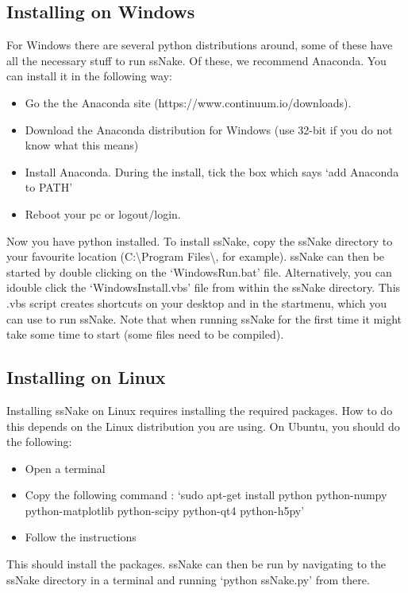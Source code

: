 \documentclass[11pt,a4paper]{article}
\begin{document}
\subsection{Installing on Windows}
For Windows there are several python distributions around, some of these have all the necessary stuff to run ssNake. Of these, we recommend Anaconda. You can install it in the following way:
\begin{itemize}
\item Go the the Anaconda site (https://www.continuum.io/downloads).
\item Download the Anaconda distribution for Windows (use 32-bit if you do not know what this means)
\item Install Anaconda. During the install, tick the box which says `add Anaconda to PATH'
\item Reboot your pc or logout/login.
\end{itemize}
Now you have python installed. To install ssNake, copy the ssNake directory to your favourite location (C:\textbackslash{}Program Files\textbackslash{}, for example). 
ssNake can then be started by double clicking on the `WindowsRun.bat' file. Alternatively, you can idouble click the `WindowsInstall.vbs' file from within the ssNake
directory. This .vbs script creates shortcuts on your desktop and in the startmenu, which you can use to run ssNake. Note that when running
ssNake for the first time it might take some time to start (some files need to be compiled).

\subsection{Installing on Linux}
Installing ssNake on Linux requires installing the required packages. How to do this depends on the Linux distribution you are using. On Ubuntu, you should do the following:
\begin{itemize}
\item Open a terminal
\item Copy the following command : `sudo apt-get install python python-numpy python-matplotlib python-scipy python-qt4 python-h5py'
\item Follow the instructions
\end{itemize}
This should install the packages. ssNake can then be run by navigating to the ssNake directory in a terminal and running `python ssNake.py' from there.
\end{document}
